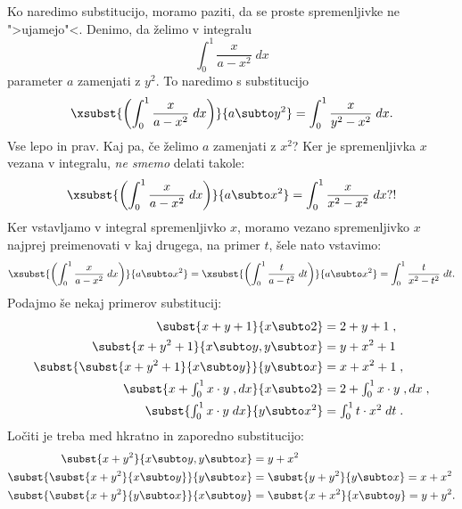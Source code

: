 Ko naredimo substitucijo, moramo paziti, da se proste spremenljivke ne
">ujamejo"<. Denimo, da želimo v integralu
%
\begin{equation*}
  \int_0^1 \frac{x}{a - x^2} \; dx
\end{equation*}
%
parameter $a$ zamenjati z $y^2$. To naredimo s substitucijo
%
\begin{equation*}
  \xsubst{\left(\int_0^1 \frac{x}{a - x^2} \; dx\right)}{a \subto y^2} =
  \int_0^1 \frac{x}{y^2 - x^2} \; dx.
\end{equation*}
%
Vse lepo in prav. Kaj pa, če želimo $a$ zamenjati z $x^2$? Ker je
spremenljivka $x$ vezana v integralu, \emph{ne smemo} delati takole:
%
\begin{equation*}
  \xsubst{\left(\int_0^1 \frac{x}{a - x^2} \; dx\right)}{a \subto x^2} =
  \int_0^1 \frac{x}{x^2 - x^2} \; dx ?!
\end{equation*}
%
Ker vstavljamo v integral spremenljivko $x$, moramo vezano
spremenljivko $x$ najprej preimenovati v kaj drugega, na primer $t$,
šele nato vstavimo:
%
\begin{equation*}
  \xsubst{\left(\int_0^1 \frac{x}{a - x^2}\; dx \right)}{a \subto x^2} =
  \xsubst{\left(\int_0^1 \frac{t}{a - t^2} \; dt\right)}{a \subto x^2} =
  \int_0^1 \frac{t}{x^2 - t^2} \; dt.
\end{equation*}
%
Podajmo še nekaj primerov substitucij:
%
\begin{align*}
  \subst{x + y + 1}{x \subto 2} &= 2 + y + 1 \;,
  \\
  \subst{x + y^2 + 1}{x \subto y, y \subto x} &= y + x^2 + 1 \;
  \\
  \subst{\subst{x + y^2 + 1}{x \subto y}}{y \subto x} &=
  x + x^2 + 1 \;,
  \\
  \textstyle
  \subst{x + \int_0^1 x \cdot y \;, d x}{x \subto 2}
  &= \textstyle  2 + \int_0^1 x \cdot y \;, d x \;,
  \\
  \textstyle
  \subst{\int_0^1 x \cdot y \; d x}{y \subto x^2}
  &= \textstyle \int_0^1 t \cdot x^2 \; d t \;.
\end{align*}
%
Ločiti je treba med hkratno in zaporedno substitucijo:
%
\begin{align*}
  \subst{x + y^2}{x \subto y, y \subto x} &= y + x^2
  \\
  \subst{\subst{x + y^2}{x \subto y}}{y \subto x} &=
  \subst{y + y^2}{y \subto x} = x + x^2
  \\
  \subst{\subst{x + y^2}{y \subto x}}{x \subto y} &=
  \subst{x + x^2}{x \subto y} = y + y^2.
\end{align*}
%

